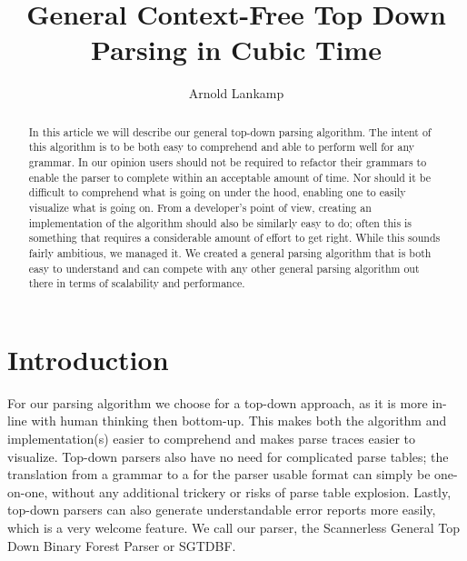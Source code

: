 \documentclass[a4paper,10pt]{article}
\title{General Context-Free Top Down Parsing in Cubic Time}
\author{Arnold Lankamp}
\begin{document}
\maketitle

\pagebreak
\begin{abstract}

In this article we will describe our general top-down parsing algorithm. The intent of this algorithm is to be both easy to comprehend and able to perform well for any grammar. In our opinion users should not be required to refactor their grammars to enable the parser to complete within an acceptable amount of time. Nor should it be difficult to comprehend what is going on under the hood, enabling one to easily visualize what is going on. From a developer's point of view, creating an implementation of the algorithm should also be similarly easy to do; often this is something that requires a considerable amount of effort to get right. While this sounds fairly ambitious, we managed it. We created a general parsing algorithm that is both easy to understand and can compete with any other general parsing algorithm out there in terms of scalability and performance.

\end{abstract}

\section{Introduction}

For our parsing algorithm we choose for a top-down approach, as it is more in-line with human thinking then bottom-up. This makes both the algorithm and implementation(s) easier to comprehend and makes parse traces easier to visualize. Top-down parsers also have no need for complicated parse tables; the translation from a grammar to a for the parser usable format can simply be one-on-one, without any additional trickery or risks of parse table explosion. Lastly, top-down parsers can also generate understandable error reports more easily, which is a very welcome feature. We call our parser, the Scannerless General Top Down Binary Forest Parser or SGTDBF.
\end{document}
